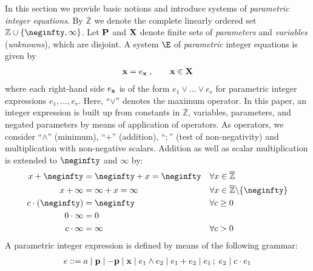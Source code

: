 \documentclass[a4paper]{easychair}
\newcommand{\ZZ}{\mathbb{Z}}
\newcommand{\ZzZ}{\overline{\mathbb Z}}
\begin{document}
In this section we provide basic notions and introduce systems of \emph{parametric integer equations}.
By $\ZzZ$ we denote the complete linearly ordered set $\ZZ \cup \{\neginfty,\infty\}$.
Let ${\bf P}$ and ${\bf X}$ denote finite sets of \emph{parameters} and \emph{variables} 
(\emph{unknowns}), which are disjoint.
A system $\E$ of \emph{parametric} integer equations is given by
\begin{align*}
	{\bf x} = e_{\bf x}\;,\qquad{\bf x}\in{\bf X}
	\end{align*}
where each right-hand side $e_{\bf x}$ is of the form $e_1\vee\ldots\vee e_r$
for parametric integer expressions $e_1,\ldots,e_r$. 
Here, ``$\vee$'' denotes the maximum operator.
In this paper, an integer expression is built up from constants
in $\ZzZ$, variables, parameters, and negated parameters by means of application of operators.
As operators, we consider ``$\wedge$'' (minimum), ``$+$'' (addition),
``$;$'' (test of non-negativity) and multiplication with non-negative scalars.
Addition as well as scalar multiplication is extended to $\neginfty$ and $\infty$ by:
\begin{align*}
x + \neginfty &= \neginfty + x = \neginfty	&&\forall x\in\ZzZ	\\
x + \infty    &= \infty + x 	= \infty	&&\forall x\in\ZzZ\backslash\{\neginfty\}\\
c\cdot(\neginfty) &= \neginfty		&&\forall c\geq 0	\\
0\cdot\infty	&= 0			&&\\
c\cdot\infty	&= \infty			&&\forall c> 0	
\end{align*}
A parametric integer expression is defined by means of the following grammar:
\begin{align*}
e\;{::=}\; a\mid{\bf p}\mid-{\bf p}\mid{\bf x}\mid e_1\wedge e_2\mid e_1 + e_2\mid e_1\,;\;e_2\mid c\cdot e_1
\end{align*}
\end{document}
